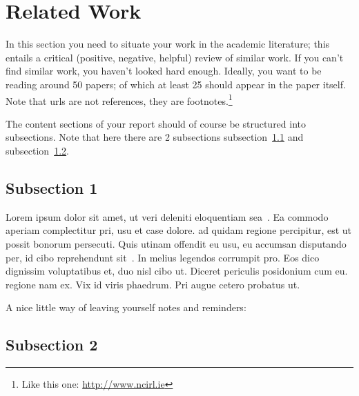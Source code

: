 
\section{Related Work}
\label{sec:rw}

In this section you need to situate your work in the academic literature; this entails a critical (positive, negative, helpful) review of similar work. If you can't find similar work, you haven't looked hard enough. Ideally, you want to be reading around 50 papers; of which at least 25 should appear in the paper itself. Note that urls are not references, they are footnotes.\footnote{Like this one: \url{http://www.ncirl.ie}}

The content sections of your report should of course be structured into subsections. Note that here there are 2 subsections subsection~\ref{sec:Subsection1} and subsection~\ref{sec:Subsection2}.

\subsection{Subsection 1}
\label{sec:Subsection1}

Lorem ipsum dolor sit amet, ut veri deleniti eloquentiam sea~\citep{FengB16}. Ea commodo aperiam complectitur pri, usu et case dolore. \citet{KuneKARB16} ad quidam regione percipitur, est ut possit bonorum persecuti. Quis utinam offendit eu usu, eu accumsan disputando per, id cibo reprehendunt sit~\citep{BeloglazovB15,GomesCT15}. In melius legendos corrumpit pro. Eos dico dignissim voluptatibus et, duo nisl cibo ut. Diceret periculis posidonium cum eu. \citet{GomesCT15} regione nam ex. Vix id viris phaedrum. Pri augue cetero probatus ut.
\citet{MOthman}
\citet{DKavan}
\citet{BZdrnja}
\citet{Kimh}
\citet{Nam}
\citet{Khan}
\citet{KhanAbdul}
\citet{Moon}
\citet{AlQarni}
\citet{Seo}
\citet{Wu}
\citet{Anderson}
\citet{Choudhari}
\citet{Kelley}
\citet{Boettiger}
\citet{Guan}
\citet{DiTommaso}
\citet{Rahman}
\citet{Patrick}
\citet{Gordon}
\citet{Arp}

A nice little way of leaving yourself notes and reminders:



\subsection{Subsection 2}
\label{sec:Subsection2}

